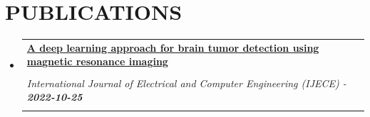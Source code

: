 \documentclass[letterpaper,11pt]{article}
\makeatletter
\newcommand{\resumeSubheading}[4]{
  \vspace{-2pt}\item
    \begin{tabular*}{1.0\textwidth}[t]{l@{\extracolsep{\fill}}r}
      \textbf{\large#1} & \textbf{\small #2} \\
      \textit{\large#3} & \textit{\small #4} \\
      
    \end{tabular*}\vspace{-7pt}
}
\newcommand{\resumeSubHeadingListStart}{\begin{itemize}[leftmargin=0.0in, label={}]}
\newcommand{\resumeSubHeadingListEnd}{\end{itemize}}
\makeatother
\begin{document}


\section{PUBLICATIONS}
  
   \resumeSubHeadingListStart
    \resumeSubheading
      {\href{https://arxiv.org/abs/2210.13882}{A deep learning approach for brain tumor detection using magnetic resonance imaging}\href{https://arxiv.org/abs/2210.13882}{\raisebox{-0.1\height}\faExternalLink }}\\
      {International Journal of Electrical and Computer Engineering (IJECE)
 - \textbf{2022-10-25}}\\
  \resumeSubHeadingListEnd 



\vspace{-7pt}

\end{document}
